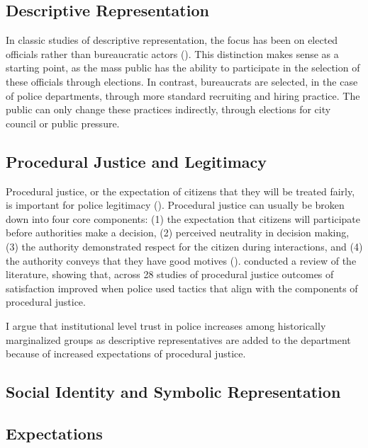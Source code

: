 \documentclass[12pt]{article}
\begin{document}
\subsection{Descriptive Representation}
In classic studies of descriptive representation, the focus has been on elected officials rather than bureaucratic actors (\cite{mansbridge1999should, mansbridge2003rethinking, dovi2002preferable}). This distinction makes sense as a starting point, as the mass public has the ability to  participate in the selection of these officials through elections. In contrast, bureaucrats are selected, in the case of police departments, through more standard recruiting and hiring practice. The public can only change these practices indirectly, through elections for city council or public pressure.

\subsection{Procedural Justice and Legitimacy}
Procedural justice, or the expectation of citizens that they will be treated fairly, is important for police legitimacy (\cite{hinds2007public, tyler2004enhancing}). Procedural justice can usually be broken down into four core components: (1) the expectation that citizens will participate before authorities make a decision, (2) perceived neutrality in decision making, (3) the authority demonstrated respect for the citizen during interactions, and (4) the authority conveys that they have good motives (\cite{goodman2010four,mazerolle2013procedural, tyler2002trust, tyler2011procedural}). \citet{mazerolle2013procedural} conducted a review of the literature, showing that, across 28 studies of procedural justice outcomes of satisfaction improved when police used tactics that align with the components of procedural justice.

I argue that institutional level trust in police increases among historically marginalized groups as descriptive representatives are added to the department because of increased expectations of procedural justice.

\subsection{Social Identity and Symbolic Representation}



\subsection{Expectations}
\end{document}
